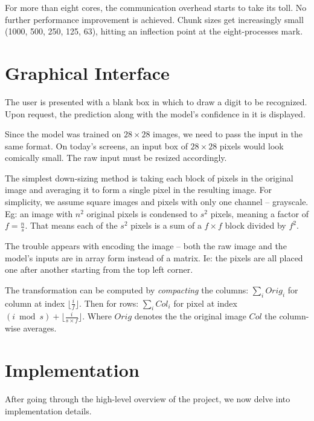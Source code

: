 \documentclass[a4paper]{article}
\newcommand{\floor}[1]{\lfloor {#1} \rfloor}
\begin{document}
For more than eight cores, the communication overhead starts to take its toll. No further performance improvement is achieved. Chunk sizes get increasingly small (1000, 500, 250, 125, 63), hitting an inflection point at the eight-processes mark.


\newpage
\section{Graphical Interface}
The user is presented with a blank box in which to draw a digit to be recognized. Upon request, the prediction along with the model's confidence in it is displayed. 


\noindent Since the model was trained on $28 \times 28$ images, we need to pass the input in the same format. On today's screens, an input box of $28 \times 28$ pixels would look comically small. The raw input must be resized accordingly.

The simplest down-sizing method is taking each block of pixels in the original image and averaging it to form a single pixel in the resulting image. For simplicity, we assume square images and pixels with only one channel -- grayscale. Eg: an image with $n^2$ original pixels is condensed to $s^2$ pixels, meaning a factor of $f=\frac{n}{s}$. That means each of the $s^2$ pixels is a sum of a $f \times f$ block divided by $f^2$.

The trouble appears with encoding the image -- both the raw image and the model's inputs are in array form instead of a matrix. Ie: the pixels are all placed one after another starting from the top left corner.

The transformation can be computed by \textit{compacting} the columns:
$\sum_i Orig_i$ for column at index $\floor{\frac{i}{f}}$. Then for rows: $\sum_i Col_i$ for pixel at index $(i \bmod s) + \floor{\frac{i}{s \times f}}$. Where $Orig$ denotes the the original image $Col$ the column-wise averages. 







\newpage
\section{Implementation}
After going through the high-level overview of the project, we now delve into implementation details.
\end{document}
